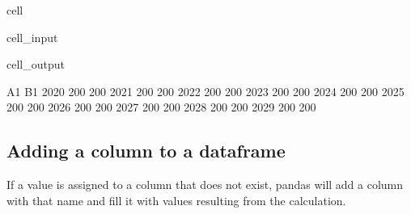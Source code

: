 \documentclass[letterpaper,10pt,english]{jupyterBook}
\begin{document}
\begin{sphinxuseclass}{cell}\begin{sphinxVerbatimInput}

\begin{sphinxuseclass}{cell_input}
\begin{sphinxVerbatim}[commandchars=\\\{\}]
  
       \PYG{p}{[}    \PYG{p}{]} 
       \PYG{p}{[}\PYG{p}{]}                                 
\end{sphinxVerbatim}

\end{sphinxuseclass}\end{sphinxVerbatimInput}
\begin{sphinxVerbatimOutput}

\begin{sphinxuseclass}{cell_output}
\begin{sphinxVerbatim}[commandchars=\\\{\}]
       A1   B1
2020  200  200
2021  200  200
2022  200  200
2023  200  200
2024  200  200
2025  200  200
2026  200  200
2027  200  200
2028  200  200
2029  200  200
\end{sphinxVerbatim}

\end{sphinxuseclass}\end{sphinxVerbatimOutput}

\end{sphinxuseclass}

\subsection{Adding a column to a dataframe}
\label{\detokenize{content/04_PythonEssentials/PythonPandasDataframes:adding-a-column-to-a-dataframe}}
\sphinxAtStartPar
If a value is assigned to a column that does not exist, pandas will add a column with that name and fill it with values resulting from  the calculation.
\end{document}
